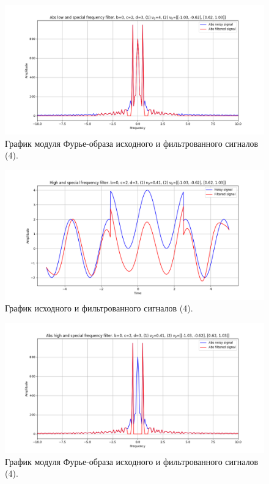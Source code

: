 \documentclass[a4paper, 12pt]{article}
\begin{document}
    \begin{figure}[!htb]
        \centering
        \includegraphics[scale=0.48]{4_3_abs_u_U_nospec.png}
        \captionsetup{skip=0pt}
        \caption{График модуля Фурье-образа исходного и фильтрованного сигналов (4).}
        \label{fig:fig108}
    \end{figure}
    \begin{figure}[!htb]
        \centering
        \includegraphics[scale=0.48]{4_4_u_flt_u_nospec.png}
        \captionsetup{skip=0pt}
        \caption{График исходного и фильтрованного сигналов (4).}
        \label{fig:fig109}
    \end{figure}
    \begin{figure}[!htb]
        \centering
        \includegraphics[scale=0.48]{4_4_abs_u_U_nospec.png}
        \captionsetup{skip=0pt}
        \caption{График модуля Фурье-образа исходного и фильтрованного сигналов (4).}
        \label{fig:fig110}
    \end{figure}
\end{document}
